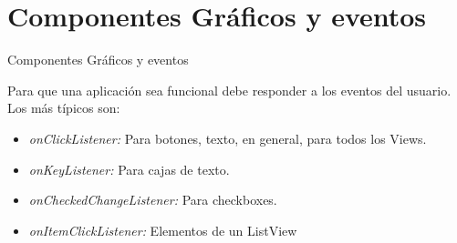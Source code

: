 \section{Componentes Gráficos y eventos}
\begin{frame}{Componentes Gráficos y eventos}
    \begin{block}{}
        Para que una aplicación sea funcional debe responder a los eventos
        del usuario. Los más típicos son:
    \end{block}
    \begin{itemize}
        \item {
            \textit{onClickListener:} Para botones, texto, en general, para todos los Views.\pause
        }
        \item {
            \textit{onKeyListener:} Para cajas de texto.
        }
        \item<3->{
            \textit{onCheckedChangeListener:} Para checkboxes.
        }
        \item<4->{
            \textit{onItemClickListener:} Elementos de un ListView
        }
    \end{itemize}
\end{frame}
